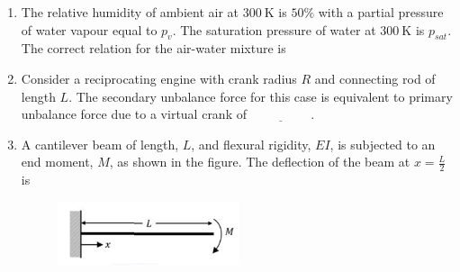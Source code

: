 \documentclass[journal]{IEEEtran}
\begin{document}
\begin{enumerate}
\hfill{}


\item The relative humidity of ambient air at $300~\text{K}$ is $50\%$ with a partial pressure of water vapour equal to $p_v$. The saturation pressure of water at $300~\text{K}$ is $p_{sat}$. The correct relation for the air-water mixture is

\begin{enumerate}
\end{enumerate}

\hfill{}

\item Consider a reciprocating engine with crank radius $R$ and connecting rod of length $L$. The secondary unbalance force for this case is equivalent to primary unbalance force due to a virtual crank of $\underline{\hspace{2cm}}$.

\begin{enumerate}
\end{enumerate}

\hfill{}



\item A cantilever beam of length, $L$, and flexural rigidity, $EI$, is subjected to an end moment, $M$, as shown in the figure. The deflection of the beam at $x = \frac{L}{2}$ is
\begin{figure}[h]
\centering
\includegraphics[width=0.5\columnwidth]{Figs/image (44).png}
\caption*{}
\label{fig:17}
\end{figure}


\end{enumerate}
\end{document}
